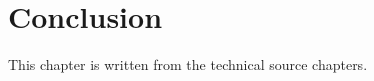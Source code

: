 \chapter{Conclusion}\label{ch:conclusion}

This chapter is written from the technical source chapters.
